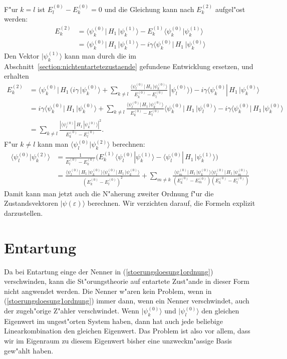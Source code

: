 F"ur $k=l$ ist $E_l^{(0)}-E_k^{(0)}=0$ und die Gleichung kann nach 
$E_k^{(2)}$ aufgel"ost werden:
\begin{align*}
E_k^{(2)}
&=
\langle\psi_k^{(0)}|\, H_1\, |\psi_k^{(1)}\rangle
-E_k^{(1)}\langle\psi_k^{(0)}|\psi_k^{(1)}\rangle
\\
&=
\langle\psi_k^{(0)}|\, H_1\, |\psi_k^{(1)}\rangle
-i\gamma
\langle \psi_k^{(0)}|\, H_1 \,|\psi_k^{(0)}\rangle
\end{align*}
Den Vektor $|\psi_k^{(1)}\rangle$ kann man durch die im
Abschnitt~\ref{section:nichtentartetezustaende} gefundene
Entwicklung ersetzen, und erhalten
\begin{align*}
E_k^{(2)}
&=
\langle\psi_k^{(0)}|\, H_1\,
\biggl(
i\gamma
\,|\psi_k^{(0)}\rangle
+
\sum_{k\ne l}
\frac{\langle \psi_l^{(0)}|\, H_1 \,|\psi_k^{(0)}\rangle}{E_k^{(0)}-E_l^{(0)}}
\,
|\psi_l^{(0)}\rangle
\biggr)
-i\gamma
\langle \psi_k^{(0)}|\, H_1 \,|\psi_k^{(0)}\rangle
\\
&=
i\gamma\langle\psi_k^{(0)}|\, H_1\, |\psi_k^{(0)}\rangle
+
\sum_{k\ne l}
\frac{\langle \psi_l^{(0)}|\, H_1 \,|\psi_k^{(0)}\rangle}{E_k^{(0)}-E_l^{(0)}}
\langle\psi_k^{(0)}|\, H_1 \,|\psi_l^{(0)}\rangle
-i\gamma
\langle \psi_k^{(0)}|\, H_1 \,|\psi_k^{(0)}\rangle
\\
&=
\sum_{k\ne l}
\frac{|\langle \psi_l^{(0)}|\, H_1 \,|\psi_k^{(0)}\rangle|^2}{E_k^{(0)}-E_l^{(0)}}.
\end{align*}
F"ur $k\ne l$ kann man $\langle\psi_l^{(0)}|\psi_k^{(2)}\rangle$ 
berechnen:
\begin{align*}
\langle\psi_l^{(0)}|\psi_k^{(2)}\rangle
&=
\frac1{E_l^{(0)}-E_k^{(0)}}\biggl(
E_k^{(1)}\langle\psi_l^{(0)}|\psi_k^{(1)}\rangle
-
\langle\psi_l^{(0)}|\,H_1\,|\psi_k^{(1)}\rangle
\biggr)
\\
&=
\frac{
\langle \psi_l^{(0)}|\, H_1 \,|\psi_k^{(0)}\rangle
\langle \psi_k^{(0)}|\, H_1 \,|\psi_k^{(0)}\rangle
}{
(E_k^{(0)}-E_l^{(0)})^2
}
+
\sum_{m\ne k}
\frac{\langle \psi_m^{(0)}|\, H_1 \,|\psi_k^{(0)}\rangle
\langle\psi_l^{(0)}|\, H_1 \,|\psi_m^{(0)}\rangle
}{
(E_k^{(0)}-E_m^{(0)})
(E_k^{(0)}-E_l^{(0)})
}
\end{align*}
Damit kann man jetzt auch die N"aherung zweiter Ordnung
f"ur die Zustandsvektoren $|\psi(\varepsilon)\rangle$
berechnen.
Wir verzichten darauf, die Formeln explizit darzustellen.

\section{Entartung}
Da bei Entartung einge der Nenner in (\ref{stoerungsloesung1ordnung})
verschwinden, kann die St"orungstheorie auf entartete Zust"ande
in dieser Form nicht angwendet werden.
Die Nenner w"aren kein Problem, wenn in (\ref{stoerungsloesung1ordnung})
immer dann, wenn ein Nenner verschwindet, auch der zugeh"orige Z"ahler
verschwindet.
Wenn $|\psi_k^{(0)}\rangle$ und $|\psi_l^{(0)}\rangle$ den gleichen
Eigenwert im ungest"orten System haben, dann hat auch jede beliebige
Linearkombination den gleichen Eigenwert.
Das Problem ist also vor allem, dass wir im Eigenraum zu diesem
Eigenwert bisher eine unzweckm"assige Basis gew"ahlt haben.

